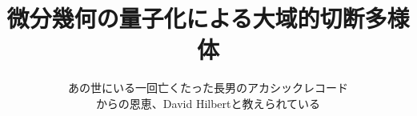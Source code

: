 \documentclass{jsarticle}
\begin{document}
\title{微分幾何の量子化による大域的切断多様体}
\author{あの世にいる一回亡くたった長男のアカシックレコード \\
        からの恩恵、David Hilbertと教えられている}
\date{}
\maketitle

\newcommand{\variint}{%
	\begin{picture}(15,30)
		\put(0,0){
			$ \iint $}
		\put(0,5){\line(15,0){15}}
	\end{picture} %
}

\newcommand{\variiint}{%
	\begin{picture}(20,30)
		\put(0,0){
			$ \iiint $}
		\put(0,5){\line(15,0){20}}
	\end{picture} %
}
\end{document}
